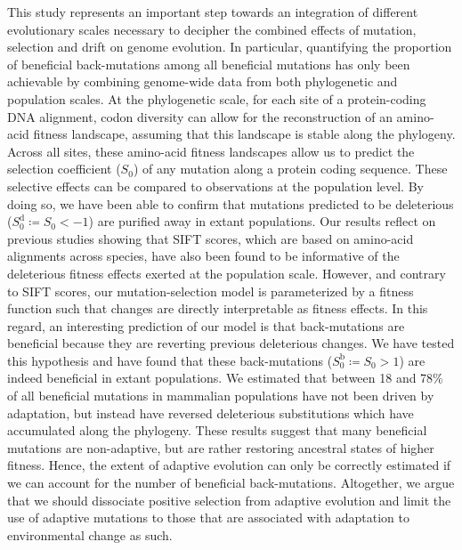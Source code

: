 \documentclass{article}
\newcommand{\Sphy}{S_{0}}
\begin{document}
    This study represents an important step towards an integration of different evolutionary scales necessary to decipher the combined effects of mutation, selection and drift on genome evolution.
    In particular, quantifying the proportion of beneficial back-mutations among all beneficial mutations has only been achievable by combining genome-wide data from both phylogenetic and population scales.
    At the phylogenetic scale, for each site of a protein-coding DNA alignment, codon diversity can allow for the reconstruction of an amino-acid fitness landscape, assuming that this landscape is stable along the phylogeny.
    Across all sites, these amino-acid fitness landscapes allow us to predict the selection coefficient ($\Sphy$) of any mutation along a protein coding sequence.
    These selective effects can be compared to observations at the population level.
    By doing so, we have been able to confirm that mutations predicted to be deleterious ($\Sphy^{\text{d}} \coloneqq \Sphy < -1$) are purified away in extant populations.
    Our results reflect on previous studies showing that SIFT scores\cite{ng_sift_2003, vaser_sift_2016}, which are based on amino-acid alignments across species, have also been found to be informative of the deleterious fitness effects exerted at the population scale\cite{chen_hunting_2021}.
    However, and contrary to SIFT scores, our mutation-selection model is parameterized by a fitness function such that changes are directly interpretable as fitness effects.
    In this regard, an interesting prediction of our model is that back-mutations are beneficial because they are reverting previous deleterious changes.
    We have tested this hypothesis and have found that these back-mutations ($\Sphy^{\text{b}} \coloneqq \Sphy > 1 $) are indeed beneficial in extant populations.
    We estimated that between 18 and 78\% of all beneficial mutations in mammalian populations have not been driven by adaptation, but instead have reversed deleterious substitutions which have accumulated along the phylogeny.
    These results suggest that many beneficial mutations are non-adaptive, but are rather restoring ancestral states of higher fitness.
    Hence, the extent of adaptive evolution can only be correctly estimated if we can account for the number of beneficial back-mutations\cite{keightley_what_2010, rice_evolutionarily_2015}.
    Altogether, we argue that we should dissociate positive selection from adaptive evolution and limit the use of adaptive mutations to those that are associated with adaptation to environmental change as such\cite{charlesworth_other_2007, mustonen_fitness_2009}.
\end{document}
